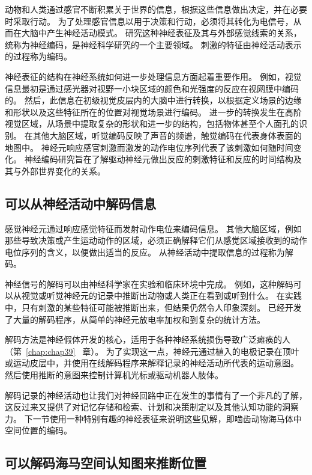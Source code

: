 动物和人类通过感官不断积累关于世界的信息，根据这些信息做出决定，并在必要时采取行动。
为了处理感官信息以用于决策和行动，必须将其转化为电信号，从而在大脑中产生神经活动模式。
研究这种神经表征及其与外部感觉线索的关系，统称为神经编码，是神经科学研究的一个主要领域。
刺激的特征由神经活动表示的过程称为编码。


神经表征的结构在神经系统如何进一步处理信息方面起着重要作用。
例如，视觉信息最初是通过感光器对视野一小块区域的颜色和光强度的反应在视网膜中编码的。
然后，此信息在初级视觉皮层内的大脑中进行转换，以根据定义场景的边缘和形状以及这些特征所在的位置对视觉场景进行编码。
进一步的转换发生在高阶视觉区域，从场景中提取复杂的形状和进一步的结构，包括物体甚至个人面孔的识别。
在其他大脑区域，听觉编码反映了声音的频谱，触觉编码在代表身体表面的地图中。
神经元响应感官刺激而激发的动作电位序列代表了该刺激如何随时间变化。
神经编码研究旨在了解驱动神经元做出反应的刺激特征和反应的时间结构及其与外部世界变化的关系。



\subsection{可以从神经活动中解码信息}

感觉神经元通过响应感觉特征而发射动作电位来编码信息。
其他大脑区域，例如那些导致决策或产生运动动作的区域，必须正确解释它们从感觉区域接收到的动作电位序列的含义，以便做出适当的反应。
从神经活动中提取信息的过程称为解码。


神经信号的解码可以由神经科学家在实验和临床环境中完成。
例如，这种解码可以从视觉或听觉神经元的记录中推断出动物或人类正在看到或听到什么。
在实践中，只有刺激的某些特征可能被推断出来，但结果仍然令人印象深刻。
已经开发了大量的解码程序，从简单的神经元放电率加权和到复杂的统计方法。


解码方法是神经假体开发的核心，适用于各种神经系统损伤导致广泛瘫痪的人（第~\ref{chap:chap39}~ 章）。 
为了实现这一点，神经元通过植入的电极记录在顶叶或运动皮层中，并使用在线解码程序来解释记录的神经活动所代表的运动意图。
然后使用推断的意图来控制计算机光标或驱动机器人肢体。


解码记录的神经活动也让我们对神经回路中正在发生的事情有了一个非凡的了解，这反过来又提供了对记忆存储和检索、计划和决策制定以及其他认知功能的洞察力。
下一节使用一种特别有趣的神经表征来说明这些见解，即啮齿动物海马体中空间位置的编码。


\subsection{可以解码海马空间认知图来推断位置}

